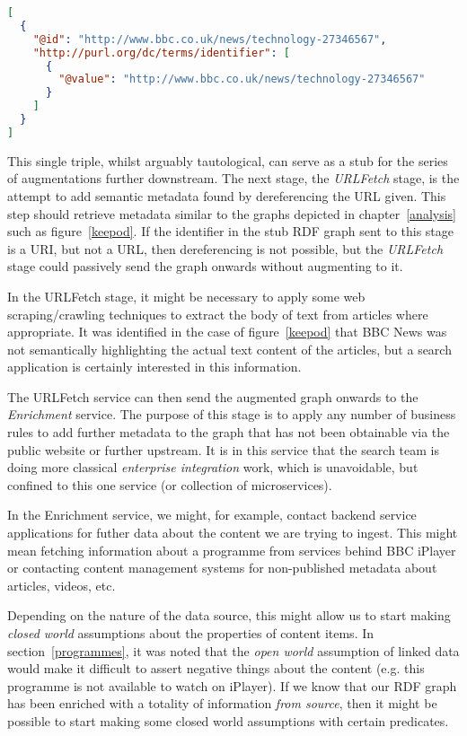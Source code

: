 \begin{centering}
\begin{lstlisting}[language=json]
[
  {
    "@id": "http://www.bbc.co.uk/news/technology-27346567",
    "http://purl.org/dc/terms/identifier": [
      {
        "@value": "http://www.bbc.co.uk/news/technology-27346567"
      }
    ]
  }
]
\end{lstlisting}
\end{centering}

This single triple, whilst arguably tautological, can serve as a stub
for the series of augmentations further downstream. The next stage,
the \emph{URLFetch} stage, is
the attempt to add semantic metadata found by dereferencing the URL
given. This step should retrieve metadata similar to the graphs depicted
in chapter~\ref{analysis} such as figure~\ref{keepod}. If the identifier
in the stub RDF graph sent to this stage is a URI, but not a URL, then
dereferencing is not possible, but the \emph{URLFetch} stage could
passively send the graph onwards without augmenting to it.

In the URLFetch stage, it might be necessary to apply some web scraping/crawling
techniques to extract the body of text from articles where appropriate.
It was identified in the case of figure~\ref{keepod} that BBC News
was not semantically highlighting the actual text content of the articles, but
a search application is certainly interested in this information.

The URLFetch service can then send the augmented graph onwards to
the \emph{Enrichment} service. The purpose of this stage is to apply
any number of business rules to add further metadata to the graph
that has not been obtainable via the public website or further upstream. It is
in this service that the search team is doing more classical
\emph{enterprise integration} work, which is unavoidable, but confined
to this one service (or collection of microservices).

In the Enrichment service, we might, for example, contact backend
service applications for futher data about the content we are trying to ingest.
This might mean fetching information about a programme from services
behind BBC iPlayer or contacting content management systems for
non-published metadata about articles, videos, etc.

Depending on the nature of the data source, this might allow us to start
making \emph{closed world} assumptions about the properties of content
items. In section~\ref{programmes}, it was noted that the \emph{open world}
assumption of linked data would make it difficult to assert negative
things about the content (e.g. this programme is not available to
watch on iPlayer). If we know that our RDF graph has been enriched
with a totality of information \emph{from source}, then it might be
possible to start making some closed world assumptions with certain predicates.

